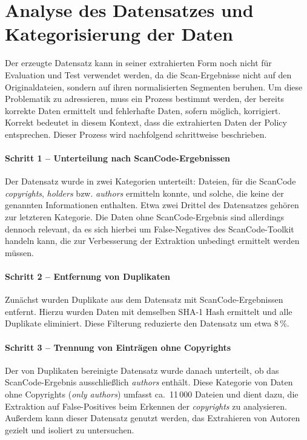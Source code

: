 \section{Analyse des Datensatzes und Kategorisierung der Daten}\label{sec:analyse-datensatz}

Der erzeugte Datensatz kann in seiner extrahierten Form noch nicht für Evaluation und Test verwendet werden, da die Scan-Ergebnisse nicht auf den Originaldateien, sondern auf ihren normalisierten Segmenten beruhen.
Um diese Problematik zu adressieren, muss ein Prozess bestimmt werden, der bereits korrekte Daten ermittelt und fehlerhafte Daten, sofern möglich, korrigiert.
Korrekt bedeutet in diesem Kontext, dass die extrahierten Daten der Policy entsprechen.
Dieser Prozess wird nachfolgend schrittweise beschrieben.

\paragraph{Schritt 1 -- Unterteilung nach ScanCode-Ergebnissen}
Der Datensatz wurde in zwei Kategorien unterteilt: Dateien, für die ScanCode \textit{copyrights}, \textit{holders} bzw. \textit{authors} ermitteln konnte, und solche, die keine der genannten Informationen enthalten.
Etwa zwei Drittel des Datensatzes gehören zur letzteren Kategorie.
Die Daten ohne ScanCode-Ergebnis sind allerdings dennoch relevant, da es sich hierbei um False-Negatives des ScanCode-Toolkit handeln kann, die zur Verbesserung der Extraktion unbedingt ermittelt werden müssen.

\paragraph{Schritt 2 -- Entfernung von Duplikaten}
Zunächst wurden Duplikate aus dem Datensatz mit ScanCode-Ergebnissen entfernt.
Hierzu wurden Daten mit demselben SHA-1 Hash ermittelt und alle Duplikate eliminiert.
Diese Filterung reduzierte den Datensatz um etwa 8\,\%.

\paragraph{Schritt 3 -- Trennung von Einträgen ohne Copyrights}
Der von Duplikaten bereinigte Datensatz wurde danach unterteilt, ob das ScanCode-Ergebnis ausschließlich \textit{authors} enthält.
Diese Kategorie von Daten ohne Copyrights (\textit{only authors}) umfasst ca.\ 11\,000 Dateien und dient dazu, die Extraktion auf False-Positives beim Erkennen der \textit{copyrights} zu analysieren.
Außerdem kann dieser Datensatz genutzt werden, das Extrahieren von Autoren gezielt und isoliert zu untersuchen.


